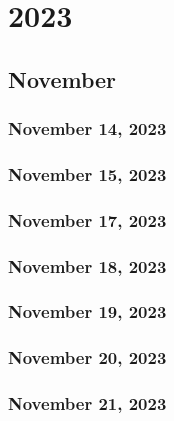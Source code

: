 \part{2023}
\chapter{November}
\section{November 14, 2023}


\section{November 15, 2023}


\section{November 17, 2023}


\section{November 18, 2023}


\section{November 19, 2023}


\section{November 20, 2023}


\section{November 21, 2023}



